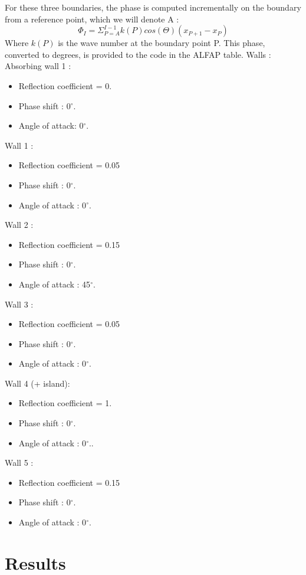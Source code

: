 For these three boundaries, the phase is computed incrementally on the boundary
from a reference point, which we will denote A :
\begin{equation}
  \Phi_I=\Sigma_{P=A}^{I-1}k(P)cos(\Theta) (x_{P+1}-x_{P})
  \end{equation}
Where $k(P)$ is the wave number at the boundary point P.
This phase, converted to degrees, is provided to the code in the ALFAP table.
Walls :
Absorbing wall 1 :
\begin{itemize}
\item Reflection coefficient = 0.
\item Phase shift : 0$^\circ$.
\item Angle of attack: 0$^\circ$.
\end{itemize}
Wall 1 :
\begin{itemize}
\item Reflection coefficient = 0.05
\item Phase shift : 0$^\circ$.
\item Angle of attack : 0$^\circ$.
\end{itemize}
Wall 2 :
\begin{itemize}
\item Reflection coefficient = 0.15
\item Phase shift : 0$^\circ$.
\item Angle of attack : 45$^\circ$.
\end{itemize}
Wall 3 :
\begin{itemize}
\item Reflection coefficient = 0.05
\item Phase shift : 0$^\circ$.
\item Angle of attack : 0$^\circ$.
\end{itemize}
Wall 4 (+ island):
\begin{itemize}
\item Reflection coefficient = 1.
\item Phase shift : 0$^\circ$.
\item Angle of attack : 0$^\circ$..
\end{itemize}
Wall 5 :
\begin{itemize}
\item Reflection coefficient = 0.15
\item Phase shift : 0$^\circ$.
\item Angle of attack : 0$^\circ$.
\end{itemize}
\section{Results}

